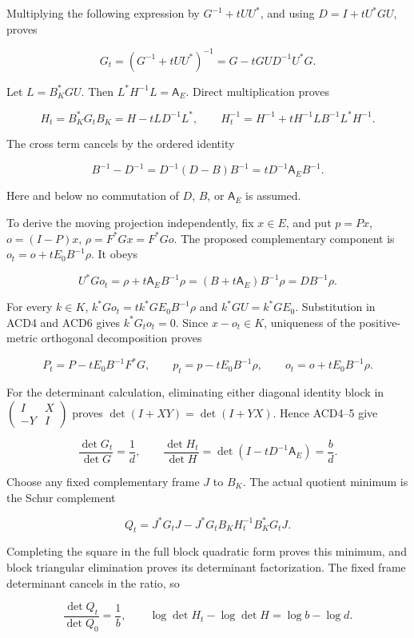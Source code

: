 \documentclass[11pt]{article}
\begin{document}
Multiplying the following expression by \(G^{-1}+tUU^*\), and using \(D=I+tU^*GU\), proves

\[
G_t=(G^{-1}+tUU^*)^{-1}=G-tGU D^{-1}U^*G .\tag{ACD4}
\]

Let \(L=B_K^*GU\). Then \(L^*H^{-1}L=\mathsf A_E\). Direct multiplication proves

\[
H_t=B_K^*G_tB_K=H-tLD^{-1}L^*,\qquad
H_t^{-1}=H^{-1}+tH^{-1}LB^{-1}L^*H^{-1}.\tag{ACD5}
\]

The cross term cancels by the ordered identity

\[
B^{-1}-D^{-1}=D^{-1}(D-B)B^{-1}=tD^{-1}\mathsf A_EB^{-1}.
\]

Here and below no commutation of \(D\), \(B\), or \(\mathsf A_E\) is assumed.

To derive the moving projection independently, fix \(x\in E\), and put \(p=Px\), \(o=(I-P)x\), \(\rho=F^*Gx=F^*Go\). The proposed complementary component is \(o_t=o+tE_0B^{-1}\rho\). It obeys

\[
U^*Go_t=\rho+t\mathsf A_EB^{-1}\rho
=(B+t\mathsf A_E)B^{-1}\rho=DB^{-1}\rho .\tag{ACD6}
\]

For every \(k\in K\), \(k^*G o_t=t k^*GE_0B^{-1}\rho\) and \(k^*GU=k^*GE_0\). Substitution in ACD4 and ACD6 gives \(k^*G_to_t=0\). Since \(x-o_t\in K\), uniqueness of the positive-metric orthogonal decomposition proves

\[
P_t=P-tE_0B^{-1}F^*G,\qquad
p_t=p-tE_0B^{-1}\rho,\qquad o_t=o+tE_0B^{-1}\rho .\tag{ACD7}
\]

For the determinant calculation, eliminating either diagonal identity block in \(\left(\begin{smallmatrix}I&X\\-Y&I\end{smallmatrix}\right)\) proves \(\det(I+XY)=\det(I+YX)\). Hence ACD4--5 give

\[
\frac{\det G_t}{\det G}=\frac1d,\qquad
\frac{\det H_t}{\det H}
=\det(I-tD^{-1}\mathsf A_E)=\frac b d.\tag{ACD8}
\]

Choose any fixed complementary frame \(J\) to \(B_K\). The actual quotient minimum is the Schur complement

\[
Q_t=J^*G_tJ-J^*G_tB_KH_t^{-1}B_K^*G_tJ.
\]

Completing the square in the full block quadratic form proves this minimum, and block triangular elimination proves its determinant factorization. The fixed frame determinant cancels in the ratio, so

\[
\frac{\det Q_t}{\det Q_0}=\frac1b,\qquad
\log\det H_t-\log\det H=\log b-\log d.\tag{ACD9}
\]
\end{document}
